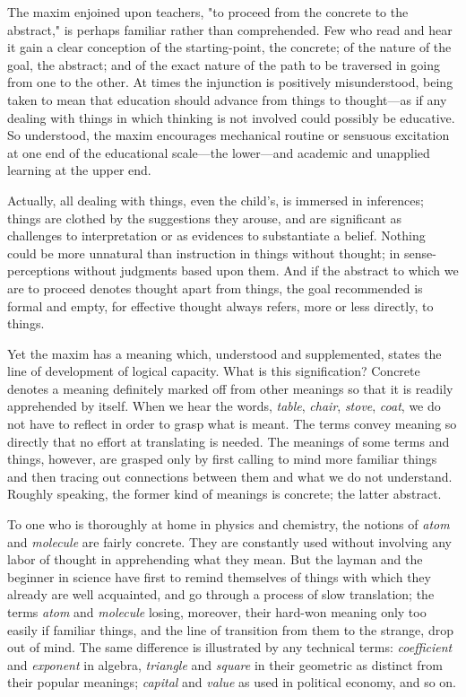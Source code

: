 \documentclass[letterpaper]{book}
\begin{document}

The maxim enjoined upon teachers, "to proceed from the concrete to the
abstract," is perhaps familiar rather than comprehended. Few who read
and hear it gain a clear conception of the starting-point, the concrete;
of the nature of the goal, the abstract; and of the exact nature of the
path to be traversed in going from one to the other. At times the
injunction is positively misunderstood, being taken to mean that
education should advance from things to thought---as if any dealing with
things in which thinking is not involved could possibly be educative. So
understood, the maxim encourages mechanical routine or sensuous
excitation at one end of the educational scale---the lower---and
academic and unapplied learning at the upper end.

Actually, all dealing with things, even the child's, is immersed in
inferences; things are clothed by the suggestions they arouse, and are
significant as challenges to interpretation or as evidences to
substantiate a belief. Nothing could be more unnatural than instruction
in things without thought; in sense-perceptions without judgments based
upon them. And if the abstract to which we are to proceed denotes
thought apart from things, the goal recommended is formal
and
empty, for effective thought always refers, more or less directly, to
things.


Yet the maxim has a meaning which, understood and supplemented, states
the line of development of logical capacity. What is this signification?
Concrete denotes a meaning definitely marked off from other meanings so
that it is readily apprehended by itself. When we hear the words,
\emph{table}, \emph{chair}, \emph{stove}, \emph{coat}, we do not have to
reflect in order to grasp what is meant. The terms convey meaning so
directly that no effort at translating is needed. The meanings of some
terms and things, however, are grasped only by first calling to mind
more familiar things and then tracing out connections between them and
what we do not understand. Roughly speaking, the former kind of meanings
is concrete; the latter abstract.


To one who is thoroughly at home in physics and chemistry, the notions
of \emph{atom} and \emph{molecule} are fairly concrete. They are
constantly used without involving any labor of thought in apprehending
what they mean. But the layman and the beginner in science have first to
remind themselves of things with which they already are well acquainted,
and go through a process of slow translation; the terms \emph{atom} and
\emph{molecule} losing, moreover, their hard-won meaning only too easily
if familiar things, and the line of transition from them to the strange,
drop out of mind. The same difference is illustrated by any technical
terms: \emph{coefficient} and \emph{exponent} in algebra,
\emph{triangle} and \emph{square} in their geometric as distinct from
their popular meanings; \emph{capital} and \emph{value} as used in
political economy, and so on.
\end{document}
